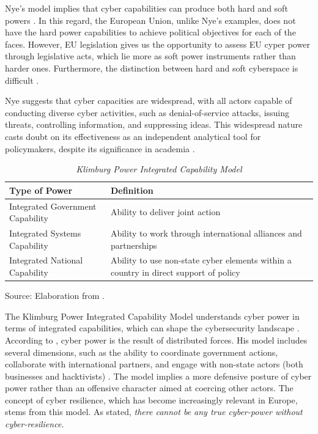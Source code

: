Nye’s model implies that cyber capabilities can produce both hard and soft powers \autocite[5]{nye_2010_cyber}. In this regard, the European Union, unlike Nye’s examples, does not have the hard power capabilities to achieve political objectives for each of the faces. However, EU legislation gives us the opportunity to assess EU cyper power through legislative acts, which lie more as soft power instruments rather than harder ones. Furthermore, the distinction between hard and soft cyberspace is difficult \autocite[5]{dunncavelty_2018_europes}. 

Nye suggests that cyber capacities are widespread, with all actors capable of conducting diverse cyber activities, such as denial-of-service attacks, issuing threats, controlling information, and suppressing ideas. This widespread nature casts doubt on its effectiveness as an independent analytical tool for policymakers, despite its significance in academia \autocite{vanhaaster_2016_assessing}.


\begin{table}[htbp]
  \caption{\emph{Klimburg Power Integrated Capability Model}}
  \begin{tabular}{p{7cm}p{7cm}}
    \toprule
    \textbf{Type of Power} & \textbf{Definition} \\
    \midrule
    Integrated Government Capability & Ability to deliver joint action \\
    \midrule
    Integrated Systems Capability & Ability to work through international alliances and partnerships \\
    \midrule
    Integrated National Capability & Ability to use non-state cyber elements within a country in direct support of policy \\
    \bottomrule
  \end{tabular}
  
    \raggedright
        \bigskip
    Source: Elaboration from \textcite[12]{dunncavelty_2018_europes}.
\end{table}

The Klimburg Power Integrated Capability Model understands cyber power in terms of integrated capabilities, which can shape the cybersecurity landscape \parencite{kasper_2021_the, klimburg_2011_cybersecurity}. According to \textcite{klimburg_2011_mobilising}, cyber power is the result of distributed forces. His model includes several dimensions, such as the ability to coordinate government actions, collaborate with international partners, and engage with non-state actors (both businesses and hacktivists) \parencite{dunncavelty_2018_europes, klimburg_2011_cybersecurity}. The model implies a more defensive posture of cyber power rather than an offensive character aimed at coercing other actors. The concept of cyber resilience, which has become increasingly relevant in Europe, stems from this model. As \textcite[6]{dunncavelty_2018_europes} stated, \textit{there cannot be any true cyber-power without cyber-resilience.}

